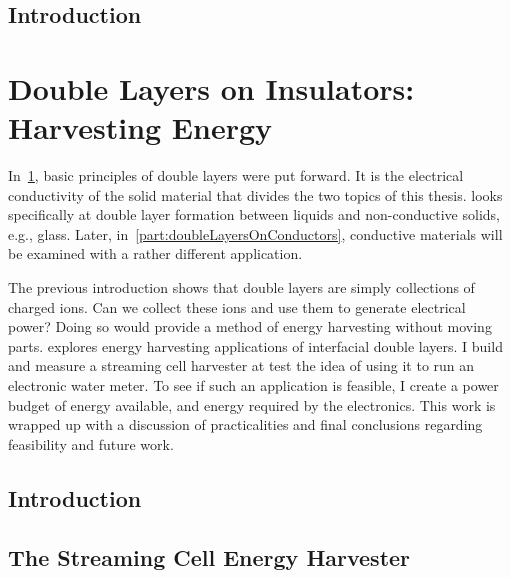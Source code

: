 \tableofcontents{}
\listoffigures
\listoftables
\doublespacing


\chapter{Introduction}
  \label{chap:introduction_main}
  


\part{Double Layers on Insulators: Harvesting Energy}
  \label{part:doubleLayersOnInsulators}
  In~\cref{chap:introduction_main}, basic principles of double layers were put forward.
  It is the electrical conductivity of the solid material that divides the two topics of this thesis.
   looks specifically at double layer formation between liquids and non-conductive solids, e.g., glass.
  Later, in~\cref{part:doubleLayersOnConductors}, conductive materials will be examined with a rather different application.

  The previous introduction shows that double layers are simply collections of charged ions.
  Can we collect these ions and use them to generate electrical power?
  Doing so would provide a method of energy harvesting without moving parts.
   explores energy harvesting applications of interfacial double layers.
  I build and measure a streaming cell harvester at test the idea of using it to run an electronic water meter.
  To see if such an application is feasible, I create a power budget of energy available, and energy required by the electronics.
  This work is wrapped up with a discussion of practicalities and final conclusions regarding feasibility and future work.

  \chapter{Introduction}
    \label{chap:harvesterIntroduction}
    

  \chapter{The Streaming Cell Energy Harvester}
    \label{chap:harvestingEnergy}
    

